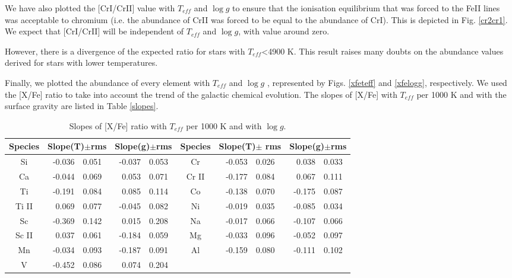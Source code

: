 \documentclass[dvips,12pt,a4paper]{report}
\begin{document}
{{We have also plotted the [CrI/CrII] value with $T_{eff}$ and $\log g$ to ensure that the ionisation equilibrium that was forced to the FeII lines \citep{Santos-2000b} was acceptable to chromium (i.e. the abundance of CrII was forced to be equal to the abundance of CrI). This is depicted in Fig. \ref{cr2cr1}. We expect that [CrI/CrII]  will be independent of $T_{eff}$ and $\log g$, with value around zero. 

However, there is a divergence of the expected ratio for stars with $T_{eff}$<4900 K. This result raises many doubts on the abundance values derived for stars with lower temperatures.

Finally, we plotted the abundance of every element with $T_{eff}$ and $\log g$ , represented by Figs. \ref{xfeteff} and  \ref{xfelogg}, respectively. We used the [X/Fe] ratio to take into account the trend of the galactic chemical evolution. The slopes of [X/Fe] with $T_{eff}$ per 1000 K and with the surface gravity are listed in Table \ref{slopes}.

\begin{table}[h]\scriptsize
\centering
\caption[Slopes of metallicity in function of $T{eff}$ per 1000 K ]{Slopes of [X/Fe] ratio with $T_{eff}$ per 1000 K and with $\log g$.} 
\begin{tabular}{ c r@{$\pm$}l r@{$\pm$}l | c r@{$\pm$}l r@{$\pm$}l}
\hline
\hline 
Species & \multicolumn {2}{c}{Slope(T)$\pm$rms} & \multicolumn {2}{c}{Slope(g)$\pm$rms} & Species & \multicolumn {2}{c}{Slope(T)$\pm$ rms} & \multicolumn {2}{c}{Slope(g)$\pm$rms} \\
\hline
Si & -0.036 & 0.051 & -0.037	& 0.053 & Cr & -0.053 &   0.026 & 0.038 & 0.033 \\
Ca &  -0.044 &    0.069 & 0.053 & 0.071 & Cr II &  -0.177 & 0.084 & 0.067 & 0.111 \\
Ti & -0.191 & 0.084 & 0.085	& 0.114 & Co & -0.138 &  0.070 & -0.175 & 0.087 \\ 
Ti II &  0.069 & 0.077 & -0.045 & 0.082 &  Ni & -0.019 & 0.035 & -0.085 & 0.034 \\
Sc & -0.369 & 0.142 & 0.015 & 0.208	& Na &-0.017 &   0.066 & -0.107 & 0.066 \\
Sc II &  0.037 & 0.061 & -0.184 & 0.059 & Mg & -0.033 & 0.096& -0.052 & 0.097 \\
Mn & -0.034  &  0.093  & -0.187 & 0.091 &  Al & -0.159  &    0.080 & -0.111 & 0.102 \\
V & -0.452 & 0.086 & 0.074 & 0.204 \\
\hline


\end{tabular}
\end{table}}}
\end{document}

